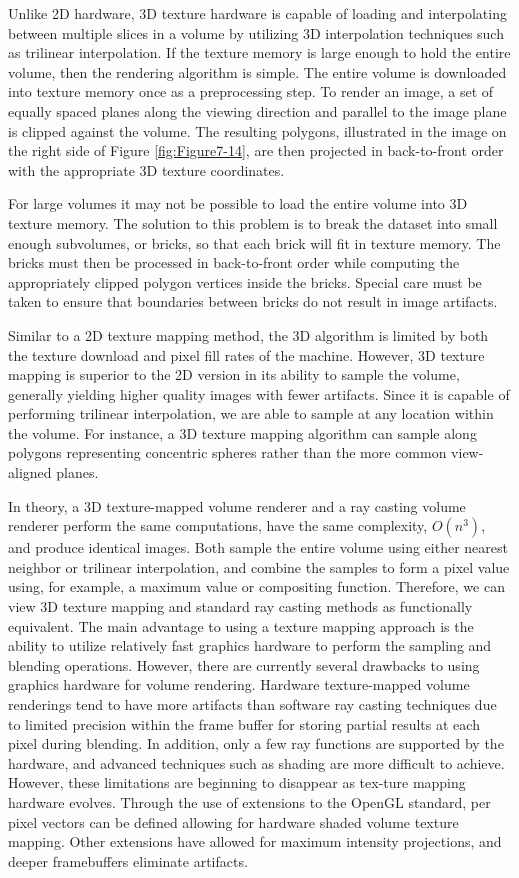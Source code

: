 Unlike 2D hardware, 3D texture hardware is capable of loading and interpolating between multiple slices in a volume by utilizing 3D interpolation techniques such as trilinear interpolation. If the texture memory is large enough to hold the entire volume, then the rendering algorithm is simple. The entire volume is downloaded into texture memory once as a preprocessing step. To render an image, a set of equally spaced planes along the viewing direction and parallel to the image plane is clipped against the volume. The resulting polygons, illustrated in the image on the right side of Figure \ref{fig:Figure7-14}, are then projected in back-to-front order with the appropriate 3D texture coordinates.

For large volumes it may not be possible to load the entire volume into 3D texture memory. The solution to this problem is to break the dataset into small enough subvolumes, or bricks, so that each brick will fit in texture memory. The bricks must then be processed in back-to-front order while computing the appropriately clipped polygon vertices inside the bricks. Special care must be taken to ensure that boundaries between bricks do not result in image artifacts.

Similar to a 2D texture mapping method, the 3D algorithm is limited by both the texture download and pixel fill rates of the machine. However, 3D texture mapping is superior to the 2D version in its ability to sample the volume, generally yielding higher quality images with fewer artifacts. Since it is capable of performing trilinear interpolation, we are able to sample at any location within the volume. For instance, a 3D texture mapping algorithm can sample along polygons representing concentric spheres rather than the more common view-aligned planes.

In theory, a 3D texture-mapped volume renderer and a ray casting volume renderer perform the same computations, have the same complexity, $O(n^3)$, and produce identical images. Both sample the entire volume using either nearest neighbor or trilinear interpolation, and combine the samples to form a pixel value using, for example, a maximum value or compositing function. Therefore, we can view 3D texture mapping and standard ray casting methods as functionally equivalent. The main advantage to using a texture mapping approach is the ability to utilize relatively fast graphics hardware to perform the sampling and blending operations. However, there are currently several drawbacks to using graphics hardware for volume rendering. Hardware texture-mapped volume renderings tend to have more artifacts than software ray casting techniques due to limited precision within the frame buffer for storing partial results at each pixel during blending. In addition, only a few ray functions are supported by the hardware, and advanced techniques such as shading are more difficult to achieve. However, these limitations are beginning to disappear as tex-ture mapping hardware evolves. Through the use of extensions to the OpenGL standard, per pixel vectors can be defined allowing for hardware shaded volume texture mapping. Other extensions have allowed for maximum intensity projections, and deeper framebuffers eliminate artifacts.

